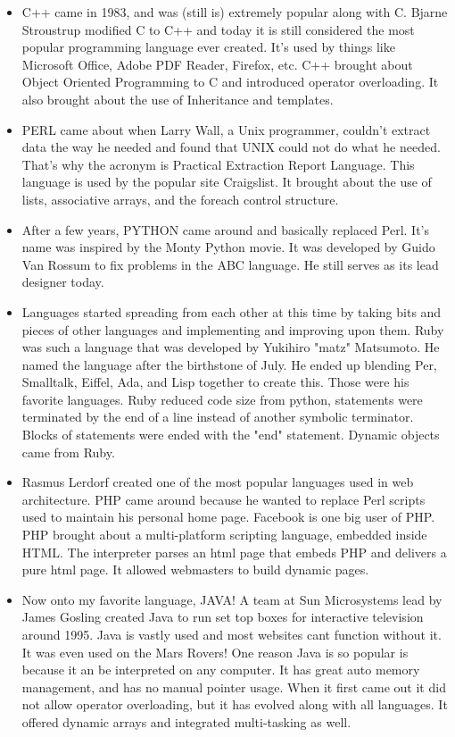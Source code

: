 \documentclass[letterpaper, 10 pt, conference]{IEEEtran}
\begin{document}
\begin{itemize}
\item C++ came in 1983, and was (still is) extremely popular along with C. Bjarne Stroustrup modified C to C++ and today it is still considered the most popular programming language ever created. It's used by things like Microsoft Office, Adobe PDF Reader, Firefox, etc. C++ brought about Object Oriented Programming to C and introduced operator overloading. It also brought about the use of Inheritance and templates. \bigskip
\item PERL came about when Larry Wall, a Unix programmer, couldn't extract data the way he needed and found that UNIX could not do what he needed. That's why the acronym is Practical Extraction Report Language. This language is used by the popular site Craigslist. It brought about the use of lists, associative arrays, and the foreach control structure. \bigskip
\item After a few years, PYTHON came around and basically replaced Perl. It's name was inspired by the Monty Python movie. It was developed by Guido Van Rossum to fix problems in the ABC language. He still serves as its lead designer today. \bigskip
\item Languages started spreading from each other at this time by taking bits and pieces of other languages and implementing and improving upon them. Ruby was such a language that was developed by Yukihiro "matz" Matsumoto. He named the language after the birthstone of July. He ended up blending Per, Smalltalk, Eiffel, Ada, and Lisp together to create this. Those were his favorite languages. Ruby reduced code size from python, statements were terminated by the end of a line instead of another symbolic terminator. Blocks of statements were ended with the "end" statement. Dynamic objects came from Ruby. \bigskip
\item Rasmus Lerdorf created one of the most popular languages used in web architecture. PHP came around because he wanted to replace Perl scripts used to maintain his personal home page. Facebook is one big user of PHP. PHP brought about a multi-platform scripting language, embedded inside HTML. The interpreter parses an html page that embeds PHP and delivers a pure html page. It allowed webmasters to build dynamic pages. \bigskip
\item Now onto my favorite language, JAVA! A team at Sun Microsystems lead by James Gosling created Java to run set top boxes for interactive television around 1995. Java is vastly used and most websites cant function without it. It was even used on the Mars Rovers! One reason Java is so popular is because it an be interpreted on any computer. It has great auto memory management, and has no manual pointer usage. When it first came out it did not allow operator overloading, but it has evolved along with all languages. It offered dynamic arrays and integrated multi-tasking as well. \bigskip

\end{itemize}
\end{document}
